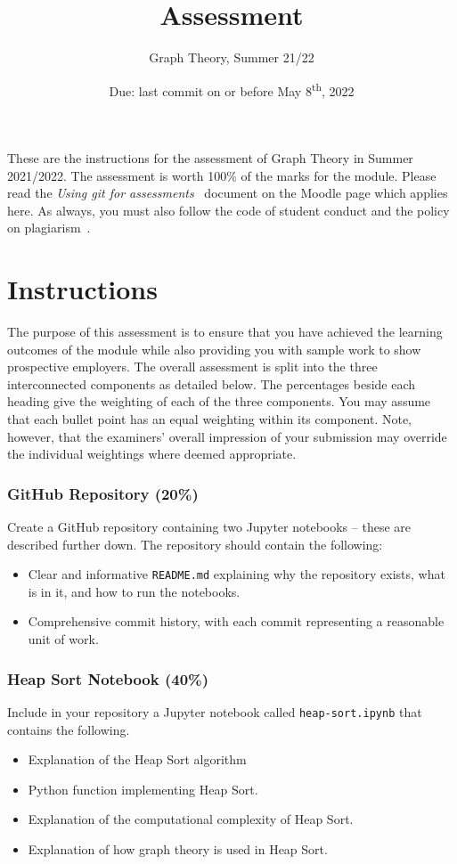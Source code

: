 \documentclass[a4paper, 12pt]{scrartcl}
\title{\vspace{-20mm}Assessment}
\author{Graph Theory, Summer 21/22}
\date{Due: last commit on or before May 8\textsuperscript{th}, 2022\vspace{-6mm}}
\begin{document}
  
  \maketitle

  These are the instructions for the assessment of Graph Theory in Summer 2021/2022.
  The assessment is worth 100\% of the marks for the module.
  Please read the \emph{Using git for assessments}~\cite{usinggit} document on the Moodle page which applies here.
  As always, you must also follow the code of student conduct and the policy on plagiarism~\cite{gmitqaf}.

  \section*{Instructions}
  
  The purpose of this assessment is to ensure that you have achieved the learning outcomes of the module while also providing you with sample work to show prospective employers.
  The overall assessment is split into the three interconnected components as detailed below.
  The percentages beside each heading give the weighting of each of the three components.
  You may assume that each bullet point has an equal weighting within its component.
  Note, however, that the examiners' overall impression of your submission may override the individual weightings where deemed appropriate.

  \subsubsection*{GitHub Repository (20\%)}
  Create a GitHub repository containing two Jupyter notebooks -- these are described further down.
  The repository should contain the following:
  \begin{itemize}
    \item Clear and informative \texttt{README.md} explaining why the repository exists, what is in it, and how to run the notebooks.
    \item Comprehensive commit history, with each commit representing a reasonable unit of work.
  \end{itemize}

  \subsubsection*{Heap Sort Notebook (40\%)}
  Include in your repository a Jupyter notebook called \texttt{heap-sort.ipynb} that contains the following.
  \begin{itemize}
    \item Explanation of the Heap Sort algorithm
    \item Python function implementing Heap Sort.
    \item Explanation of the computational complexity of Heap Sort.
    \item Explanation of how graph theory is used in Heap Sort.
  \end{itemize}
  
\end{document}
